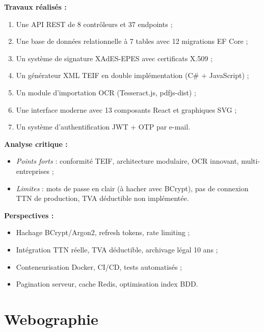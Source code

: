 \documentclass[a4paper,12pt]{report}
\begin{document}
\textbf{Travaux réalisés :}
\begin{enumerate}[nosep]
    \item Une API REST de 8 contrôleurs et 37 endpoints ;
    \item Une base de données relationnelle à 7 tables avec 12 migrations EF Core ;
    \item Un système de signature XAdES-EPES avec certificats X.509 ;
    \item Un générateur XML TEIF en double implémentation (C\# + JavaScript) ;
    \item Un module d'importation OCR (Tesseract.js, pdfjs-dist) ;
    \item Une interface moderne avec 13 composants React et graphiques SVG ;
    \item Un système d'authentification JWT + OTP par e-mail.
\end{enumerate}

\textbf{Analyse critique :}
\begin{itemize}
    \item \textit{Points forts} : conformité TEIF, architecture modulaire, OCR innovant, multi-entreprises ;
    \item \textit{Limites} : mots de passe en clair (à hacher avec BCrypt), pas de connexion TTN de production, TVA déductible non implémentée.
\end{itemize}

\textbf{Perspectives :}
\begin{itemize}[nosep]
    \item Hachage BCrypt/Argon2, refresh tokens, rate limiting ;
    \item Intégration TTN réelle, TVA déductible, archivage légal 10 ans ;
    \item Conteneurisation Docker, CI/CD, tests automatisés ;
    \item Pagination serveur, cache Redis, optimisation index BDD.
\end{itemize}


\chapter*{Webographie}
\end{document}
